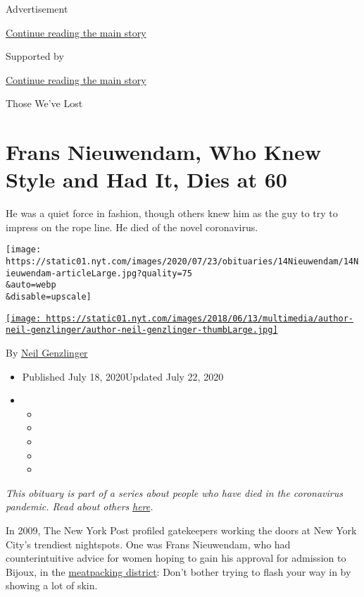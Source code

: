 Advertisement

\protect\hyperlink{after-top}{Continue reading the main story}

Supported by

\protect\hyperlink{after-sponsor}{Continue reading the main story}

Those We've Lost

\hypertarget{frans-nieuwendam-who-knew-style-and-had-it-dies-at-60}{%
\section{Frans Nieuwendam, Who Knew Style and Had It, Dies at
60}\label{frans-nieuwendam-who-knew-style-and-had-it-dies-at-60}}

He was a quiet force in fashion, though others knew him as the guy to
try to impress on the rope line. He died of the novel coronavirus.

\texttt{[image: https://static01.nyt.com/images/2020/07/23/obituaries/14Nieuwendam/14Nieuwendam-articleLarge.jpg?quality=75\\\&auto=webp\\\&disable=upscale]}

\href{https://www.nytimes.com/by/neil-genzlinger}{\texttt{[image: https://static01.nyt.com/images/2018/06/13/multimedia/author-neil-genzlinger/author-neil-genzlinger-thumbLarge.jpg]}}

By \href{https://www.nytimes.com/by/neil-genzlinger}{Neil Genzlinger}

\begin{itemize}
\item
  Published July 18, 2020Updated July 22, 2020
\item
  \begin{itemize}
  \item
  \item
  \item
  \item
  \item
  \end{itemize}
\end{itemize}

\emph{This obituary is part of a series about people who have died in
the coronavirus pandemic. Read about others}
\href{https://www.nytimes.com/interactive/2020/obituaries/people-died-coronavirus-obituaries.html}{\emph{here}}\emph{.}

In 2009, The New York Post profiled gatekeepers working the doors at New
York City's trendiest nightspots. One was Frans Nieuwendam, who had
counterintuitive advice for women hoping to gain his approval for
admission to Bijoux, in the
\href{https://www.meatpacking-district.com/}{meatpacking district}:
Don't bother trying to flash your way in by showing a lot of skin.


